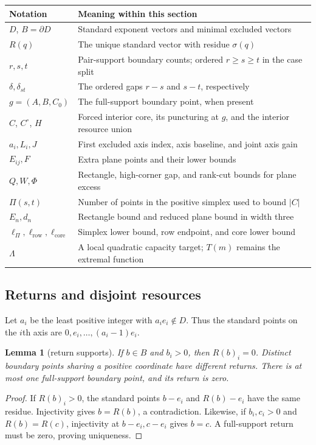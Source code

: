 \documentclass[11pt]{article}
\newtheorem{lemma}[theorem]{Lemma}
\theoremstyle{definition}
\theoremstyle{remark}
\theoremstyle{plain}
\begin{document}
\begin{center}
\begin{tabular}{@{}p{.21\linewidth}p{.72\linewidth}@{}}\toprule
Notation&Meaning within this section\\\midrule
$D$, $B=\partial D$&Standard exponent vectors and minimal excluded vectors\\
$R(q)$&The unique standard vector with residue $\sigma(q)$\\
$r,s,t$&Pair-support boundary counts; ordered $r\ge s\ge t$ in the case split\\
$\delta,\delta_{st}$&The ordered gaps $r-s$ and $s-t$, respectively\\
$g=(A,B,C_0)$&The full-support boundary point, when present\\
$C$, $C^\circ$, $H$&Forced interior core, its puncturing at $g$, and the interior resource union\\
$a_i,L_i,J$&First excluded axis index, axis baseline, and joint axis gain\\
$E_{ij},F$&Extra plane points and their lower bounds\\
$Q,W,\Phi$&Rectangle, high-corner gap, and rank-cut bounds for plane excess\\
$\Pi(s,t)$&Number of points in the positive simplex used to bound $|C|$\\
$E_n,d_n$&Rectangle bound and reduced plane bound in width three\\
$\ell_{\Pi},\ell_{\mathrm{row}},\ell_{\mathrm{core}}$&Simplex lower bound, row endpoint, and core lower bound\\
$\Lambda$&A local quadratic capacity target; $T(m)$ remains the extremal function\\\bottomrule
\end{tabular}
\end{center}

\subsection{Returns and disjoint resources}
Let $a_i$ be the least positive integer with $a_ie_i\notin D$.
Thus the standard points on the $i$th axis are $0,e_i,\ldots,(a_i-1)e_i$.
\begin{lemma}[return supports]\label{res:A.1}
If $b\in B$ and $b_i>0$, then $R(b)_i=0$.
Distinct boundary points sharing a positive coordinate have different
returns. There is at most one full-support boundary point, and its return
is zero.
\end{lemma}
\begin{proof}
If $R(b)_i>0$, the standard points $b-e_i$ and $R(b)-e_i$ have the
same residue. Injectivity gives $b=R(b)$, a contradiction.
Likewise, if $b_i,c_i>0$ and $R(b)=R(c)$, injectivity at $b-e_i,c-e_i$
gives $b=c$. A full-support return must be zero, proving uniqueness.
\end{proof}
\end{document}
